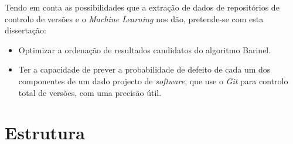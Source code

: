 Tendo em conta as possibilidades que a extração de dados de repositórios de controlo de versões e o \emph{Machine Learning} nos dão, pretende-se com esta dissertação:
%
\begin{itemize}
\item Optimizar a ordenação de resultados candidatos do algoritmo Barinel.
\item Ter a capacidade de prever a probabilidade de defeito de cada um dos componentes de um dado projecto de \emph{software}, que use o \emph{Git} para controlo total de versões, com uma precisão útil.
\end{itemize}

\section{Estrutura} \label{sec:struct}


